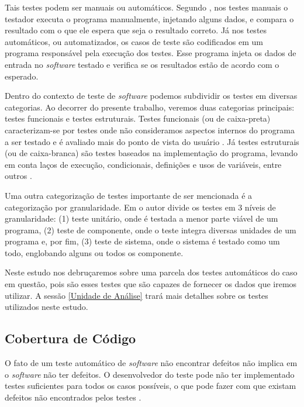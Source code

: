 \documentclass[11.5pt]{article}
\begin{document}
Tais testes podem ser manuais ou automáticos.
Segundo \cite{engSwSommerville}, nos testes manuais o testador executa o programa manualmente,
injetando alguns dados, e compara o resultado com o que ele espera que seja o resultado correto.
Já nos testes automáticos, ou automatizados, os casos de teste são codificados em um programa
responsável pela execução dos testes.
Esse programa injeta os dados de entrada no \textit{software} testado e verifica se os resultados
estão de acordo com o esperado.

Dentro do contexto de teste de \textit{software} podemos subdividir os testes em diversas
categorias. Ao decorrer do presente trabalho, veremos duas categorias principais: testes funcionais
e testes estruturais.
Testes funcionais (ou de caixa-preta) caracterizam-se por testes onde não consideramos aspectos
internos do programa a ser testado e é avaliado mais do ponto de vista do usuário \cite{introTeste}.
Já testes estruturais (ou de caixa-branca) são testes baseados na implementação do programa, levando
em conta laços de execução, condicionais, definições e usos de variáveis, entre outros
\cite{introTeste}.

Uma outra categorização de testes importante de ser mencionada é a categorização por granularidade.
Em \cite{engSwSommerville} o autor divide os testes em 3 níveis de granularidade:
(1) teste unitário, onde é testada a menor parte viável de um programa,
(2) teste de componente, onde o teste integra diversas unidades de um programa e, por fim,
(3) teste de sistema, onde o sistema é testado como um todo, englobando alguns ou todos os
componente.



Neste estudo nos debruçaremos sobre uma parcela dos testes automáticos do caso em questão, pois são
esses testes que são capazes de fornecer os dados que iremos utilizar. A sessão
\ref{Unidade de Análise} trará mais detalhes sobre os testes utilizados neste estudo.



\subsection{Cobertura de Código}

O fato de um teste automático de \textit{software} não encontrar defeitos não implica em o
\textit{software} não ter defeitos.
O desenvolvedor do teste pode não ter implementado testes suficientes para todos os casos possíveis,
o que pode fazer com que existam defeitos não encontrados pelos testes \cite{engSwSommerville}.
\end{document}
